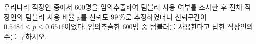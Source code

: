 우리나라 직장인 중에서 $600$명을 임의추출하여 텀블러 사용 여부를 조사한 후 전체 직장인의 텀블러 사용 비율 $p$를 신뢰도 $99\mkern3mu \%$로 추정하였더니 신뢰구간이 $0.5484\le p\le 0.6516$이었다. 임의추출한 $600$명 중 텀블러를 사용한다고 답한 직장인의 수를 구하시오.
